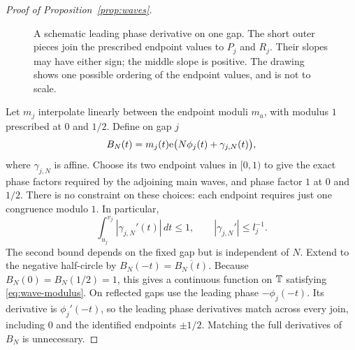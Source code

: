 \begin{proof}[Proof of Proposition~\ref{prop:waves}]
\begin{figure}[tb]
\centering
{}
\caption{A schematic leading phase derivative on one gap.  The short
outer pieces join the prescribed endpoint values to $P_j$ and $R_j$.
Their slopes may have either sign; the middle slope is positive.
The drawing shows one possible ordering of the endpoint values, and is
not to scale.}\label{fig:gap-derivative}
\end{figure}

Let $m_j$ interpolate linearly between the endpoint moduli $m_a$, with
modulus $1$ prescribed at $0$ and $1/2$.  Define on gap $j$
\begin{equation}\label{eq:gap-wave}
 B_N(t)=m_j(t)\mathrm e\bigl(N\phi_j(t)+\gamma_{j,N}(t)\bigr),
\end{equation}
where $\gamma_{j,N}$ is affine.  Choose its two endpoint values in
$[0,1)$ to give the exact phase factors required by the adjoining main
waves, and phase factor $1$ at $0$ and $1/2$.  There is no constraint on
these choices: each endpoint requires just one congruence modulo $1$.
In particular,
\[
 \int_{u_j}^{v_j}|\gamma_{j,N}'(t)|\,dt\le1,
 \qquad |\gamma_{j,N}'|\le l_j^{-1}.
\]
The second bound depends on the fixed gap but is independent of $N$.
Extend to the negative half-circle by
$B_N(-t)=\overline{B_N(t)}$.  Because $B_N(0)=B_N(1/2)=1$, this gives a
continuous function on $\mathbb T$ satisfying \eqref{eq:wave-modulus}.
On reflected gaps use the leading phase $-\phi_j(-t)$.  Its derivative is
$\phi_j'(-t)$, so the leading phase derivatives match across every join,
including $0$ and the identified endpoints $\pm1/2$.  Matching the full
derivatives of $B_N$ is unnecessary.


\end{proof}
